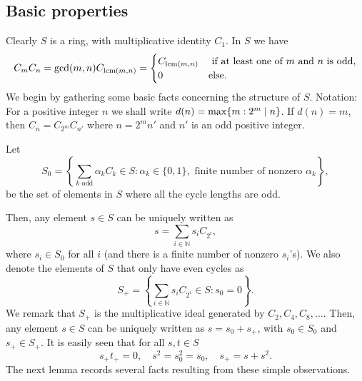 \documentclass[a4paper, 11pt]{article}
\theoremstyle{plain}
\theoremstyle{definition}
\newcommand{\N} {\mathbb{N}}
\newcommand{\lcm}       {\mathrm{lcm}}
\begin{document}
\subsection{Basic properties} \label{subsection:S_basic_properties}

Clearly $S$ is a ring, with multiplicative identity $C_1$. In $S$ we have \cite[Proposition 3]{DFMMR19}
$$C_mC_n = {\rm gcd}(m,n)C_{\lcm(m,n)} = \begin{cases} C_{\lcm(m,n)} & \mbox{ if at least one of } m \mbox{ and }n \mbox{ is odd,}\\
0& \mbox{else.}\end{cases}$$
We begin by gathering some basic facts concerning the structure of $S$. Notation: For a positive integer $n$ we shall write $d(n) = {\rm max}\{m: 2^m \mid n\}$. If $d(n)=m$, then $C_n = C_{2^m}C_{n'}$ where $n=2^mn'$ and $n'$ is an odd positive integer. 

Let
\[
    S_0 = \left\{ \sum_{ k \text{ odd} } \alpha_k C_k \in S : \alpha_k \in \{0,1\}, \text{ finite number of nonzero } \alpha_k \right\},
\]
be the set of elements in $S$ where all the cycle lengths are odd.

Then, any element $s \in S$ can be uniquely written as 
\[
    s = \sum_{i \in \N} s_i C_{ 2^i },
\]
where $s_i \in S_0$ for all $i$ (and there is a finite number of nonzero $s_i$'s). We also denote the elements of $S$ that only have even cycles as 
\[
    S_+ = \left \{ \sum_{i \in \N} s_i C_{ 2^i} \in S: s_0 = 0 \right \}.
\]
We remark that $S_+$ is the multiplicative ideal generated by $C_2, C_4, C_8, \dots$.
Then, any element $s \in S$ can be uniquely written as $s = s_0 + s_+$, with $s_0 \in S_0$ and $s_+ \in S_+$. It is easily seen that for all $s,t \in S$
\[
     s_+t_+ = 0, \quad s^2 = s_0^2=s_0, \quad s_+ = s + s^2.
\]
The next lemma records several facts resulting from these simple  observations.
\end{document}
